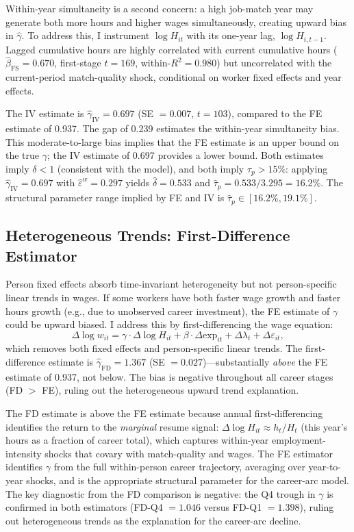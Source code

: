 \documentclass[12pt]{article}
\theoremstyle{definition}
\theoremstyle{remark}
\begin{document}
Within-year simultaneity is a second concern: a high job-match year may generate both more
hours and higher wages simultaneously, creating upward bias in $\hat{\gamma}$. To address
this, I instrument $\log H_{it}$ with its one-year lag, $\log H_{i,t-1}$. Lagged cumulative
hours are highly correlated with current cumulative hours ($\hat{\beta}_{\text{FS}} = 0.670$,
first-stage $t = 169$, within-$R^2 = 0.980$) but uncorrelated with the current-period
match-quality shock, conditional on worker fixed effects and year effects.

The IV estimate is $\hat{\gamma}_{\text{IV}} = 0.697$ (SE $= 0.007$, $t = 103$), compared
to the FE estimate of 0.937. The gap of 0.239 estimates the within-year simultaneity bias.
This moderate-to-large bias implies that the FE estimate is an upper bound on the true $\gamma$;
the IV estimate of 0.697 provides a lower bound. Both estimates imply $\delta < 1$
(consistent with the model), and both imply $\tau_p > 15\%$: applying $\hat{\gamma}_{\text{IV}} = 0.697$
with $\hat{\varepsilon}^w = 0.297$ yields $\hat{\delta} = 0.533$ and $\hat{\tau}_p = 0.533/3.295 = 16.2\%$.
The structural parameter range implied by FE and IV is $\hat{\tau}_p \in [16.2\%, 19.1\%]$.

\subsection{Heterogeneous Trends: First-Difference Estimator}

Person fixed effects absorb time-invariant heterogeneity but not person-specific linear
trends in wages. If some workers have both faster wage growth and faster hours growth (e.g.,
due to unobserved career investment), the FE estimate of $\gamma$ could be upward biased.
I address this by first-differencing the wage equation:
\begin{equation}
\Delta \log w_{it} = \gamma \cdot \Delta \log H_{it} + \beta \cdot \Delta \text{exp}_{it}
+ \Delta \lambda_t + \Delta \varepsilon_{it},
\end{equation}
which removes both fixed effects and person-specific linear trends. The first-difference
estimate is $\hat{\gamma}_{\text{FD}} = 1.367$ (SE $= 0.027$)---substantially \emph{above}
the FE estimate of 0.937, not below. The bias is negative throughout all career stages
(FD $>$ FE), ruling out the heterogeneous upward trend explanation.

The FD estimate is above the FE estimate because annual first-differencing identifies the
return to the \emph{marginal} resume signal: $\Delta \log H_{it} \approx h_t / H_t$ (this
year's hours as a fraction of career total), which captures within-year employment-intensity
shocks that covary with match-quality and wages. The FE estimator identifies $\gamma$ from
the full within-person career trajectory, averaging over year-to-year shocks, and is the
appropriate structural parameter for the career-arc model. The key diagnostic from the FD
comparison is negative: the Q4 trough in $\gamma$ is confirmed in both estimators (FD-Q4 $=
1.046$ versus FD-Q1 $= 1.398$), ruling out heterogeneous trends as the explanation for the
career-arc decline.
\end{document}
